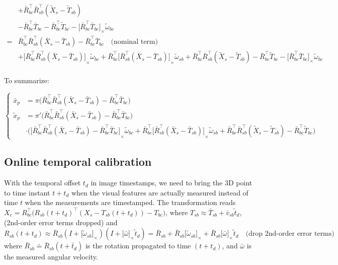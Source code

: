 \documentclass[letter,10pt]{article}
\newcommand{\asym}[1]{{\lbrack #1\rbrack}_\times{}}
\begin{document}
\begin{equation}
\begin{aligned}
 &+ \bar R_{bc}^\top\bar R_{sb}^\top (\tilde X_s - \tilde T_{sb}) \\
 &- \bar R_{bc}^\top \bar T_{bc} 
 - \bar R_{bc}^\top \tilde T_{bc} 
 - \asym{\bar R_{bc}^\top \bar T_{bc}}\tilde \omega_{bc}  \\
=& \bar R_{bc}^\top \bar R_{sb}^\top (\bar X_s - \bar T_{sb}) - \bar R_{bc}^\top \bar T_{bc} \quad\text{(nominal term)}\\
&+ \asym{\bar R_{bc}^\top \bar R_{sb}^\top (\bar X_s - \bar T_{sb})}\tilde \omega_{bc} 
+ \bar R_{bc}^\top \asym{ \bar R_{sb}^\top (\bar X_s - \bar T_{sb})}\tilde \omega_{sb}
 + \bar R_{bc}^\top\bar R_{sb}^\top (\tilde X_s - \tilde T_{sb}) 
 - \bar R_{bc}^\top \tilde T_{bc} - \asym{\bar R_{bc}^\top \bar T_{bc}} \tilde \omega_{bc} \\
\end{aligned}
\end{equation}

To summarize:

\begin{equation}
\begin{cases}
\bar x_p &= \pi\big(\bar R_{bc}^\top \bar R_{sb}^\top (\bar X_s - \bar T_{sb}) - \bar R_{bc}^\top \bar T_{bc}\big) \\
\tilde x_p &= \pi'\big(\bar R_{bc}^\top \bar R_{sb}^\top (\bar X_s - \bar T_{sb}) - \bar R_{bc}^\top \bar T_{bc}\big) \\
    &\cdot 
    
    \big( 
    \asym{\bar R_{bc}^\top \bar R_{sb}^\top (\bar X_s - \bar T_{sb}) - \bar R_{bc}^\top \bar T_{bc}}\tilde \omega_{bc} 
+ \bar R_{bc}^\top \asym{\bar R_{sb}^\top (\bar X_s - \bar T_{sb})}\tilde \omega_{sb}
+ \bar R_{bc}^\top\bar R_{sb}^\top (\tilde X_s - \tilde T_{sb}) 
- \bar R_{bc}^\top \tilde T_{bc}
    \big)
\end{cases}
\label{eq-msckf-gsb}
\end{equation}

\subsection{Online temporal calibration}

With the temporal offset $t_d$ in image timestamps, we need to bring the 3D point to time instant $t+t_d$ when the visual features are actually measured instead of time $t$ when the measurements are timestamped. The transformation reads $X_c = R_{bc}^\top\big(R_{sb}(t+t_d)^\top (X_s - T_{sb}(t+t_d)) - T_{bc}\big)$, where $T_{sb}\approx \bar T_{sb} + \bar v_{sb} \tilde t_d$,(2nd-order error terms dropped) and
$$
R_{sb}(t+t_d) \approx \bar R_{sb}(I+\asym{\tilde \omega_{sb}})(I + \asym{\bar\omega}\tilde t_d)=\bar R_{sb} + \bar R_{sb}\asym{\tilde \omega_{sb}} + \bar R_{sb}\asym{\bar\omega} \tilde t_d \quad\text{(drop 2nd-order error terms)}
$$
where $\bar R_{sb}\doteq \bar R_{sb}(t+\bar t_d)$ is the rotation propagated to time $(t+t_d)$, and $\bar \omega$ is the measured angular velocity.
\end{document}
